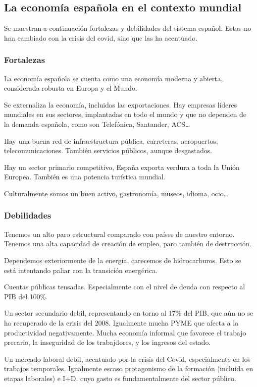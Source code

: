 \subsection{La economía española en el contexto mundial} %
    Se muestran a continuación fortalezas y debilidades del sistema español. Estas no han cambiado con la crisis del covid, sino que las ha acentuado.
    \subsubsection{Fortalezas}
        La economía española se cuenta como una economía moderna y abierta, considerada robusta en Europa y el Mundo.

        Se externaliza la economía, incluidas las exportaciones. Hay empresas líderes mundiales en sus sectores, implantadas en todo el mundo y que no dependen de la demanda española, como son Telefónica, Santander, ACS\dots

        Hay una buena red de infraestructura pública, carreteras, aeropuertos, telecomunicaciones. También servicios públicos, aunque desgastados.

        Hay un sector primario competitivo, España exporta verdura a toda la Unión Europea. También es una potencia turística mundial.

        Culturalmente somos un buen activo, gastronomía, museos, idioma, ocio\dots

    \subsubsection{Debilidades}
        Tenemos un alto paro estructural comparado con países de nuestro entorno. Tenemos una alta capacidad de creación de empleo, paro también de destrucción.

        Dependemos exteriormente de la energía, carecemos de hidrocarburos. Esto se está intentando paliar con la transición energérica.

        Cuentas públicas tensadas. Especialmente con el nivel de deuda con respecto al PIB del 100\%.

        Un sector secundario debil, representando en torno al 17\% del PIB, que aún no se ha recuperado de la crisis del 2008. Igualmente mucha PYME que afecta a la productividad negativamente. Mucha economía informal que favorece el trabajo precario, la inseguridad de los trabajdores, y los ingresos del estado.

        Un mercado laboral debil, acentuado por la crisis del Covid, especialmente en los trabajos temporales. Igualmente escaso protagonismo de la formación (incluida en etapas laborales) e I+D, cuyo gasto es fundamentalmente del sector público.

